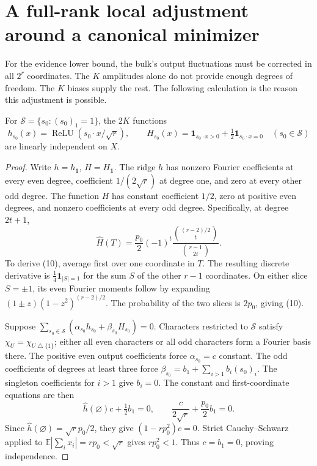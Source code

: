 \documentclass[11pt]{article}
\newcommand{\E}{\mathbb E}\newcommand{\R}{\mathbb R}\newcommand{\Pp}{\mathbb P}
\newcommand{\one}{\mathbf1}\newcommand{\relu}{\operatorname{ReLU}}
\begin{document}
\section{A full-rank local adjustment around a canonical minimizer}
For the evidence lower bound, the bulk's output fluctuations must be
corrected in all $2^r$ coordinates. The $K$ amplitudes alone do not
provide enough degrees of freedom. The $K$ biases supply the rest.
The following calculation is the reason this adjustment is possible.

\begin{lemma}
For $\mathcal S=\{s_0:(s_0)_1=1\}$, the $2K$ functions
\[
 h_{s_0}(x)=\relu(s_0\cdot x/\sqrt r),\qquad
 H_{s_0}(x)=\one_{s_0\cdot x>0}+\tfrac12\one_{s_0\cdot x=0}
 \quad(s_0\in\mathcal S)
\]
are linearly independent on $X$.
\end{lemma}
\begin{proof}
Write $h=h_{\one}$, $H=H_{\one}$. The ridge $h$ has nonzero Fourier
coefficients at every even degree, coefficient $1/(2\sqrt r)$ at
degree one, and zero at every other odd degree. The function $H$ has
constant coefficient $1/2$, zero at positive even degrees, and nonzero
coefficients at every odd degree. Specifically, at degree $2t+1$,
\[
 \widehat H(T)=\frac{p_0}{2}(-1)^t
       \frac{\binom{(r-2)/2}{t}}{\binom{r-1}{2t}}.           \tag{10}
\]
To derive (10), average first over one coordinate in $T$. The resulting
discrete derivative is $\frac14\one_{|S|=1}$ for the sum $S$ of
the other $r-1$ coordinates. On either slice $S=\pm1$, its even
Fourier moments follow by expanding
$(1\pm z)(1-z^2)^{(r-2)/2}$. The probability of the two slices is
$2p_0$, giving (10).

Suppose $\sum_{s_0\in\mathcal S}(\alpha_{s_0}h_{s_0}
+\beta_{s_0}H_{s_0})=0$. Characters restricted to $\mathcal S$
satisfy $\chi_U=\chi_{U\mathbin\triangle\{1\}}$; either all even
characters or all odd characters form a Fourier basis there.
The positive even output coefficients force $\alpha_{s_0}=c$ constant.
The odd coefficients of degrees at least three force
$\beta_{s_0}=b_1+\sum_{i>1}b_i(s_0)_i$.
The singleton coefficients for $i>1$ give $b_i=0$.
The constant and first-coordinate equations are then
\[
 \widehat h(\varnothing)c+\tfrac12b_1=0,
 \qquad \frac{c}{2\sqrt r}+\frac{p_0}{2}b_1=0.
\]
Since $\widehat h(\varnothing)=\sqrt r p_0/2$, they give
$(1-rp_0^2)c=0$. Strict Cauchy--Schwarz applied to
$\E|\sum_i x_i|=rp_0<\sqrt r$ gives $rp_0^2<1$.
Thus $c=b_1=0$, proving independence.
\end{proof}
\end{document}
